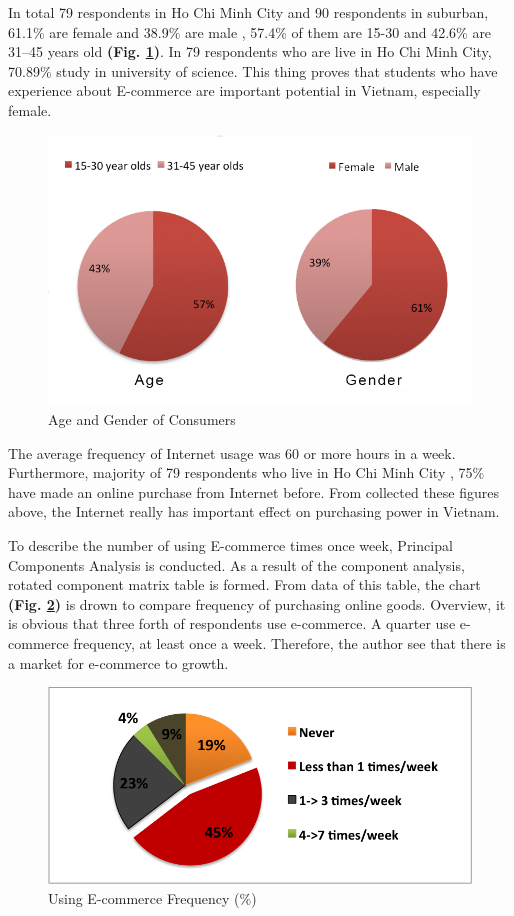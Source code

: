 \documentclass[conference]{IEEEtran}
\begin{document}
In total 79 respondents in Ho Chi Minh City and 90 respondents in suburban, 61.1\% are female and 38.9\% are male , 57.4\% of them are 15-30 and 42.6\% are 31–45 years old \textbf{(Fig. \ref{fig:agegender})}. In 79 respondents who are live in Ho Chi Minh City,  70.89\% study in university of science. This thing proves that students who have experience about E-commerce are important potential in Vietnam, especially female. 



\begin{figure}[h]
\centering
\includegraphics[width=0.7\linewidth]{./agegender}
\caption{Age and Gender of Consumers}
\label{fig:agegender}
\end{figure}



The average frequency of Internet usage was 60 or more hours in a week. Furthermore, majority of  79 respondents who live in Ho Chi Minh City , 75\% have made an online purchase from Internet before. From collected these figures above, the Internet really has important effect on purchasing power in Vietnam.

To describe the number of using E-commerce times once week, Principal Components Analysis is conducted. As a result of the component analysis, rotated component matrix table is formed. From data of this table, the chart \textbf{(Fig. \ref{fig:ecfreq})} is drown to compare frequency of purchasing online goods. Overview, it is obvious that three forth of respondents use e-commerce. A quarter use e-commerce frequency, at least once a week. Therefore, the author see that there is a market for e-commerce to growth.

\begin{figure}[h]
\centering
\includegraphics[width=0.7\linewidth]{./ecfreq}
\caption{Using E-commerce Frequency (\%)}
\label{fig:ecfreq}
\end{figure}
\end{document}
